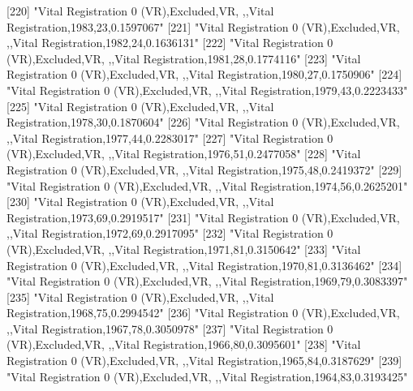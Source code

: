 [220] "Vital Registration 0 (VR),Excluded,VR, ,,Vital Registration,1983,23,0.1597067"                                                
[221] "Vital Registration 0 (VR),Excluded,VR, ,,Vital Registration,1982,24,0.1636131"                                                
[222] "Vital Registration 0 (VR),Excluded,VR, ,,Vital Registration,1981,28,0.1774116"                                                
[223] "Vital Registration 0 (VR),Excluded,VR, ,,Vital Registration,1980,27,0.1750906"                                                
[224] "Vital Registration 0 (VR),Excluded,VR, ,,Vital Registration,1979,43,0.2223433"                                                
[225] "Vital Registration 0 (VR),Excluded,VR, ,,Vital Registration,1978,30,0.1870604"                                                
[226] "Vital Registration 0 (VR),Excluded,VR, ,,Vital Registration,1977,44,0.2283017"                                                
[227] "Vital Registration 0 (VR),Excluded,VR, ,,Vital Registration,1976,51,0.2477058"                                                
[228] "Vital Registration 0 (VR),Excluded,VR, ,,Vital Registration,1975,48,0.2419372"                                                
[229] "Vital Registration 0 (VR),Excluded,VR, ,,Vital Registration,1974,56,0.2625201"                                                
[230] "Vital Registration 0 (VR),Excluded,VR, ,,Vital Registration,1973,69,0.2919517"                                                
[231] "Vital Registration 0 (VR),Excluded,VR, ,,Vital Registration,1972,69,0.2917095"                                                
[232] "Vital Registration 0 (VR),Excluded,VR, ,,Vital Registration,1971,81,0.3150642"                                                
[233] "Vital Registration 0 (VR),Excluded,VR, ,,Vital Registration,1970,81,0.3136462"                                                
[234] "Vital Registration 0 (VR),Excluded,VR, ,,Vital Registration,1969,79,0.3083397"                                                
[235] "Vital Registration 0 (VR),Excluded,VR, ,,Vital Registration,1968,75,0.2994542"                                                
[236] "Vital Registration 0 (VR),Excluded,VR, ,,Vital Registration,1967,78,0.3050978"                                                
[237] "Vital Registration 0 (VR),Excluded,VR, ,,Vital Registration,1966,80,0.3095601"                                                
[238] "Vital Registration 0 (VR),Excluded,VR, ,,Vital Registration,1965,84,0.3187629"                                                
[239] "Vital Registration 0 (VR),Excluded,VR, ,,Vital Registration,1964,83,0.3193425"                                                
